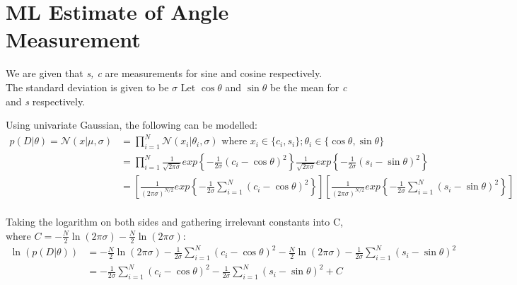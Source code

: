 \documentclass[a4paper]{article}
\begin{document}
\bigskip
\section*{ML Estimate of Angle Measurement}
We are given that \textit{s, c} are measurements for sine and cosine respectively.\\
The standard deviation is given to be $\sigma$
Let $\cos{\theta}$ and $\sin{\theta}$ be the mean for \textit{c} and \textit{s} respectively.

Using univariate Gaussian, the following can be modelled:
\begin{align*}
    p(D|\theta) = \mathcal{N}(x|\mu, \sigma) &= \prod_{i=1}^{N}\mathcal{N}(x_i|\theta_i, \sigma) \text{\ where \ } x_i \in \{ c_i, s_i \}; \theta_i \in \{ \cos{\theta}, \sin{\theta} \} \\
    &= \prod_{i=1}^{N}\frac{1}{\sqrt{2\pi\sigma}}exp\left\{-\frac{1}{2\sigma}(c_{i} - \cos{\theta})^2 \right\}  \frac{1}{\sqrt{2\pi\sigma}}exp\left\{-\frac{1}{2\sigma}(s_{i} - \sin{\theta})^2\right\} \\
    &= \left[\frac{1}{(2\pi\sigma)^{N/2}}exp\left\{-\frac{1}{2\sigma}\sum_{i=1}^{N}(c_{i} - \cos{\theta})^2\right\}\right] \left[\frac{1}{(2\pi\sigma)^{N/2}}exp\left\{-\frac{1}{2\sigma}\sum_{i=1}^{N}(s_{i} - \sin{\theta})^2\right\}\right] \\
\end{align*}{}

Taking the logarithm on both sides and gathering irrelevant constants into C, where $ C = -\frac{N}{2}\ln(2\pi\sigma)  -\frac{N}{2}\ln(2\pi\sigma)$:
\begin{align*}
    \ln(p(D|\theta)) &= -\frac{N}{2}\ln(2\pi\sigma) -\frac{1}{2\sigma}\sum_{i=1}^{N}(c_i - \cos{\theta})^2  -\frac{N}{2}\ln(2\pi\sigma) -\frac{1}{2\sigma}\sum_{i=1}^{N}(s_i - \sin{\theta})^2 \\
    &= -\frac{1}{2\sigma}\sum_{i=1}^{N}(c_i - \cos{\theta})^2 -\frac{1}{2\sigma}\sum_{i=1}^{N}(s_i - \sin{\theta})^2 + C \\
\end{align*}{}
\end{document}
